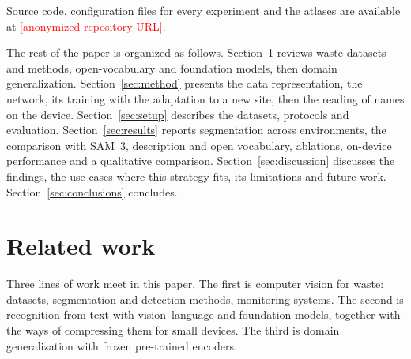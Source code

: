 \documentclass[pdflatex,sn-basic,Numbered]{sn-jnl}%
\newcommand{\tbd}[1]{\textcolor{red}{[#1]}}
\begin{document}
Source code, configuration files for every experiment and the atlases are available at \tbd{anonymized repository URL}.

The rest of the paper is organized as follows. Section~\ref{sec:related} reviews waste datasets and methods, open-vocabulary and foundation models, then domain generalization. Section~\ref{sec:method} presents the data representation, the network, its training with the adaptation to a new site, then the reading of names on the device. Section~\ref{sec:setup} describes the datasets, protocols and evaluation. Section~\ref{sec:results} reports segmentation across environments, the comparison with SAM~3, description and open vocabulary, ablations, on-device performance and a qualitative comparison. Section~\ref{sec:discussion} discusses the findings, the use cases where this strategy fits, its limitations and future work. Section~\ref{sec:conclusions} concludes.

\section{Related work}\label{sec:related}

Three lines of work meet in this paper. The first is computer vision for waste: datasets, segmentation and detection methods, monitoring systems. The second is recognition from text with vision--language and foundation models, together with the ways of compressing them for small devices. The third is domain generalization with frozen pre-trained encoders.
\end{document}
